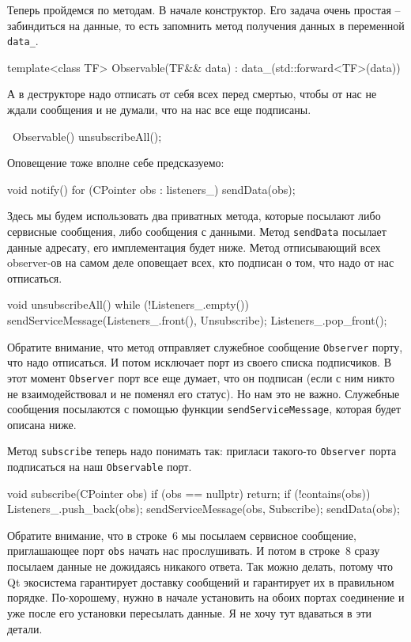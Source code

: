 Теперь пройдемся по методам.
В начале конструктор.
Его задача очень простая -- забиндиться на данные, то есть запомнить метод получения данных в переменной \verb"data_".
\begin{cppcode}
template<class TF>
Observable(TF&& data) : data_(std::forward<TF>(data)) {}

\end{cppcode}
А в деструкторе надо отписать от себя всех перед смертью, чтобы от нас не ждали сообщения и не думали, что на нас все еще подписаны.
\begin{cppcode}
~Observable() {
  unsubscribeAll();
}
\end{cppcode}
Оповещение тоже вполне себе предсказуемо:
\begin{cppcode}
void notify() {
  for (CPointer obs : listeners_)
    sendData(obs);
}
\end{cppcode}
Здесь мы будем использовать два приватных метода, которые посылают либо сервисные сообщения, либо сообщения с данными.
Метод \verb"sendData" посылает данные адресату, его имплементация будет ниже.
Метод отписывающий всех observer-ов на самом деле оповещает всех, кто подписан о том, что надо от нас отписаться.
\begin{cppcode}
void unsubscribeAll() {
  while (!Listeners_.empty()) {
    sendServiceMessage(Listeners_.front(), {Unsubscribe});
    Listeners_.pop_front();
  }
}
\end{cppcode}
Обратите внимание, что метод отправляет служебное сообщение \verb"Observer" порту, что надо отписаться.
И потом исключает порт из своего списка подписчиков.
В этот момент \verb"Observer" порт все еще думает, что он подписан (если с ним никто не взаимодействовал и не поменял его статус).
Но нам это не важно.
Служебные сообщения посылаются с помощью функции \verb"sendServiceMessage", которая будет описана ниже.

Метод \verb"subscribe" теперь надо понимать так: пригласи такого-то \verb"Observer" порта подписаться на наш \verb"Observable" порт.
\begin{cppcode}
void subscribe(CPointer obs) {
  if (obs == nullptr)
    return;
  if (!contains(obs)) {
    Listeners_.push_back(obs);
    sendServiceMessage(obs, {Subscribe});
  }
  sendData(obs);
}
\end{cppcode}
Обратите внимание, что в строке~6 мы посылаем сервисное сообщение, приглашающее порт \verb"obs" начать нас прослушивать.
И потом в строке~8 сразу посылаем данные не дожидаясь никакого ответа.
Так можно делать, потому что Qt экосистема гарантирует доставку сообщений и гарантирует их в правильном порядке.
По-хорошему, нужно в начале установить на обоих портах соединение и уже после его установки пересылать данные.
Я не хочу тут вдаваться в эти детали.

